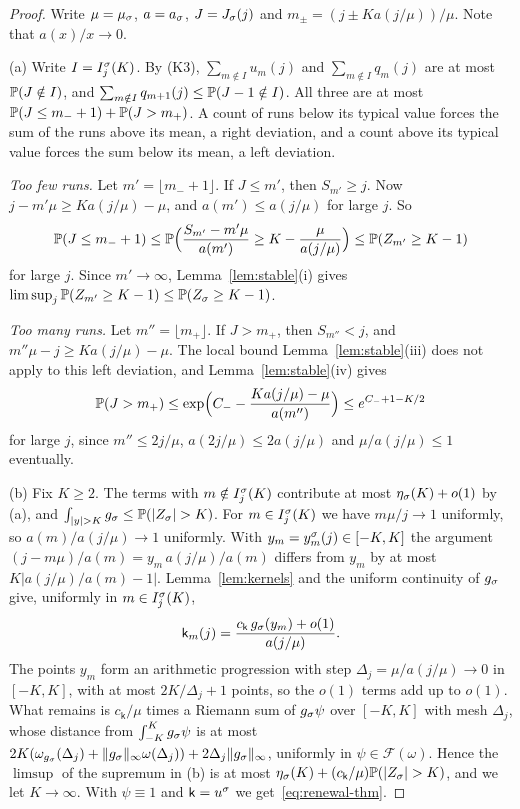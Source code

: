 \begin{proof}
Write $\mu=\mu_\sigma$, $a=a_\sigma$, $J=J_\sigma(j)$ and $m_\pm=(j\pm Ka(j/\mu))/\mu$. Note that
$a(x)/x\to0$.

(a) Write $I=I^\sigma_j(K)$. By (K3), $\sum_{m\notin I}u_m(j)$ and $\sum_{m\notin I}q_m(j)$
are at most $\mathbb{P}(J\notin I)$, and $\sum_{m\notin I}q_{m+1}(j)\le\mathbb{P}(J-1\notin I)$.
All three are at most $\mathbb{P}(J\le m_-+1)+\mathbb{P}(J>m_+)$. A count of runs below its
typical value forces the sum of the runs above its mean, a right deviation, and a
count above its typical value forces the sum below its mean, a left deviation.

\emph{Too few runs.} Let $m'=\lfloor m_-+1\rfloor$. If $J\le m'$, then $S_{m'}\ge j$. Now
$j-m'\mu\ge Ka(j/\mu)-\mu$, and $a(m')\le a(j/\mu)$ for large $j$. So
\[
 \mathbb{P}(J\le m_-+1)\le\mathbb{P}\Bigl(\frac{S_{m'}-m'\mu}{a(m')}\ge K-\frac{\mu}{a(j/\mu)}\Bigr)
 \le\mathbb{P}(Z_{m'}\ge K-1)
\]
for large $j$. Since $m'\to\infty$, Lemma~\ref{lem:stable}(i) gives
$\limsup_j\mathbb{P}(Z_{m'}\ge K-1)\le\mathbb{P}(Z_\sigma\ge K-1)$.

\emph{Too many runs.} Let $m''=\lfloor m_+\rfloor$. If $J>m_+$, then $S_{m''}<j$, and
$m''\mu-j\ge Ka(j/\mu)-\mu$. The local bound Lemma~\ref{lem:stable}(iii) does not apply
to this left deviation, and Lemma~\ref{lem:stable}(iv) gives
\[
 \mathbb{P}(J>m_+)\le\exp\Bigl(C_--\frac{Ka(j/\mu)-\mu}{a(m'')}\Bigr)\le e^{C_-+1-K/2}
\]
for large $j$, since $m''\le2j/\mu$, $a(2j/\mu)\le2a(j/\mu)$ and $\mu/a(j/\mu)\le1$
eventually.

(b) Fix $K\ge2$. The terms with $m\notin I^\sigma_j(K)$ contribute at most
$\eta_\sigma(K)+o(1)$ by (a), and $\int_{|y|>K}g_\sgn\le\Prob(|Z_\sgn|>K)$. For
$m\in I^\sigma_j(K)$ we have $m\mu/j\to1$ uniformly, so $a(m)/a(j/\mu)\to1$ uniformly.
With $y_m=y^\sigma_m(j)\in[-K,K]$ the argument $(j-m\mu)/a(m)=y_m\,a(j/\mu)/a(m)$ differs
from $y_m$ by at most $K|a(j/\mu)/a(m)-1|$. Lemma~\ref{lem:kernels} and the uniform
continuity of $g_\sigma$ give, uniformly in $m\in I^\sigma_j(K)$,
\[
 \mathsf k_m(j)=\frac{c_{\mathsf k}\,g_\sigma(y_m)+o(1)}{a(j/\mu)} .
\]
The points $y_m$ form an arithmetic progression with step $\Delta_j=\mu/a(j/\mu)\to0$
in $[-K,K]$, with at most $2K/\Delta_j+1$ points, so the $o(1)$ terms add up to $o(1)$.
What remains is $c_{\mathsf k}/\mu$ times a Riemann sum of $g_\sigma\psi$ over $[-K,K]$ with
mesh $\Delta_j$, whose distance from $\int_{-K}^Kg_\sigma\psi$ is at most
$2K(\omega_{g_\sigma}(\Delta_j)+\|g_\sigma\|_\infty\omega(\Delta_j))+2\Delta_j\|g_\sigma\|_\infty$,
uniformly in $\psi\in\mathcal F(\omega)$. Hence the $\limsup$ of the supremum in (b) is
at most $\eta_\sgn(K)+(c_{\mathsf k}/\mu)\Prob(|Z_\sgn|>K)$, and we let $K\to\infty$.
With $\psi\equiv1$ and $\mathsf k=u^\sigma$ we get~\eqref{eq:renewal-thm}.
\end{proof}

